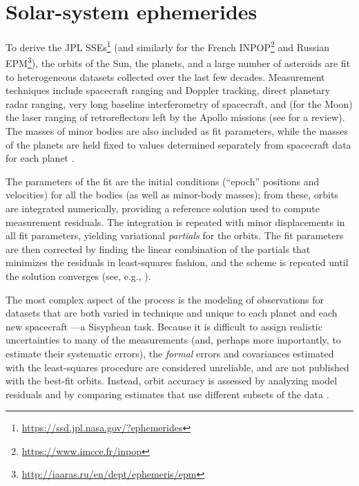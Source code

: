 \documentclass[iop,apj,twocolappendix]{emulateapj}
\begin{document}
\section{Solar-system ephemerides}
\label{sec:sses}

To derive the JPL SSEs\footnote{\href{https://ssd.jpl.nasa.gov/?ephemerides}{https://ssd.jpl.nasa.gov/?ephemerides}} (and similarly for the French INPOP\footnote{\href{https://www.imcce.fr/inpop}{https://www.imcce.fr/inpop}} and Russian EPM\footnote{\href{http://iaaras.ru/en/dept/ephemeris/epm}{http://iaaras.ru/en/dept/ephemeris/epm}}),
the orbits of the Sun, the planets, and a large number of asteroids are fit to heterogeneous datasets collected over the last few decades. Measurement techniques include spacecraft ranging and Doppler tracking, direct planetary radar ranging, very long baseline interferometry of spacecraft, and (for the Moon) the laser ranging of retroreflectors left by the Apollo missions (see \citealt{verma2013} for a review). The masses of minor bodies are also included as fit parameters, while the masses of the planets are held fixed to values determined separately from spacecraft data for each planet \citep{jh+2000,2006AJ....132.2520J,2014AJ....148...76J,2009AJ....137.4322J}.

The parameters of the fit are the initial conditions (``epoch'' positions and velocities) for all the bodies (as well as minor-body masses); from these, orbits are integrated numerically, providing a reference solution used to compute measurement residuals.
The integration is repeated with minor displacements in all fit parameters, yielding variational \emph{partials} for the orbits. The fit parameters are then corrected by finding the linear combination of the partials that minimizes the residuals in least-squares fashion, and the scheme is repeated until the solution converges (see, e.g., \citealt{1983A&A...125..150N}).

The most complex aspect of the process is the modeling of observations for datasets that are both varied in technique and unique to each planet and each new spacecraft \citep{moyer2003}---a Sisyphean task. Because it is difficult to assign realistic uncertainties to many of the measurements (and, perhaps more importantly, to estimate their systematic errors), the \emph{formal} errors and covariances estimated with the least-squares procedure are considered unreliable, and are not published with the best-fit orbits. Instead, orbit accuracy is assessed by analyzing model residuals and by comparing estimates that use different subsets of the data \citep{de434cov,de438}.
\end{document}
